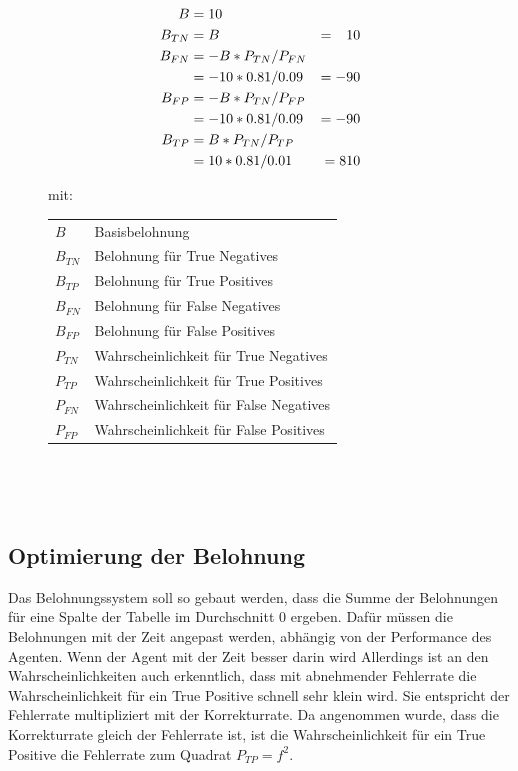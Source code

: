 \documentclass[oneside,bibliography=totocnumbered,BCOR=5mm]{scrbook}%
\makeatletter
\theoremstyle{definition}
\theoremstyle{definition}
\theoremstyle{definition}
\theoremstyle{definition}
\theoremstyle{definition}
\theoremstyle{definition}
\newenvironment{conditions}[1][mit:]
  {#1 \begin{tabular}[t]{>{$}l<{$} @{${}={}$} l}}
  {\end{tabular}\\[\belowdisplayskip]}
\makeatother
\begin{document}
\begin{figure}
\begin{align*}
  B &= 10 \\
  B_{TN} &= B & = \phantom{-} 10 \\
  B_{FN} &= - B * P_{TN} / P_{FN} \\
  &= -10 * 0.81 / 0.09 &= -90 \notag\\
  B_{FP} &= - B * P_{TN} / P_{FP} \\
  &= -10 * 0.81 / 0.09 &= -90 \notag\\
  B_{TP} &= B * P_{TN} / P_{TP} \\
  &= 10 * 0.81 / 0.01 &= 810 \notag\\
\end{align*} 


\begin{conditions}
  B & Basisbelohnung \\
  B_{TN} & Belohnung für True Negatives \\
  B_{TP} & Belohnung für True Positives \\
  B_{FN} & Belohnung für False Negatives \\
  B_{FP} & Belohnung für False Positives \\
  P_{TN} & Wahrscheinlichkeit für True Negatives \\
  P_{TP} & Wahrscheinlichkeit für True Positives \\
  P_{FN} & Wahrscheinlichkeit für False Negatives \\
  P_{FP} & Wahrscheinlichkeit für False Positives
\end{conditions}

\end{figure}
\leavevmode \\


\subsection{Optimierung der Belohnung}
Das Belohnungssystem soll so gebaut werden, dass die Summe der Belohnungen für eine Spalte der Tabelle
im Durchschnitt 0 ergeben. Dafür müssen die Belohnungen mit der Zeit angepast werden, abhängig von der
Performance des Agenten. Wenn der Agent mit der Zeit besser darin wird 
Allerdings ist an den Wahrscheinlichkeiten auch erkenntlich, 
dass mit abnehmender Fehlerrate die Wahrscheinlichkeit für ein True Positive schnell sehr klein wird.
Sie entspricht der Fehlerrate multipliziert mit der Korrekturrate.
Da angenommen wurde, dass die Korrekturrate gleich der Fehlerrate ist, ist die Wahrscheinlichkeit
für ein True Positive die Fehlerrate zum Quadrat \(P_{TP} = f^2\). \\
\end{document}
